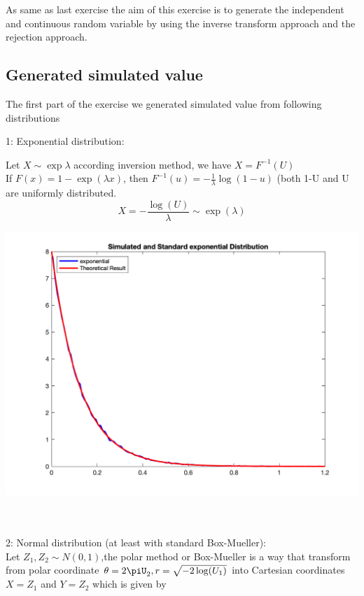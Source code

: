 As same as last exercise the aim of this exercise is to generate the independent and continuous random variable by using the inverse transform approach and the rejection approach.

\subsection{Generated simulated value}
The first part of the exercise we generated simulated value from following distributions

1: Exponential distribution:

Let $X\sim \exp{\lambda}$ according inversion method, we have $X=F^{-1}(U)$\\
If $F(x)=1-\exp{(\lambda x)}$, then $F^{-1}(u)=-\frac{1}{\lambda}\log(1-u)$ (both 1-U and U are uniformly distributed.
\begin{equation}
    X=-\frac{\log(U)}{\lambda}\sim \exp{(\lambda)}
\end{equation}
\begin{center}
    \includegraphics[scale=0.3]{Figures/figure3_1.png}\\
\end{center}\\
\\
2: Normal distribution (at least with standard Box-Mueller):\\
Let $Z_{1},Z_{2}\sim N(0,1)$,the polar method or Box-Mueller is a way that transform from polar coordinate $\theta=2\piU_{2},r=\sqrt{-2\log(U_1)}$ into Cartesian coordinates$X=Z_{1}$ and $Y=Z_{2}$ which is given by
